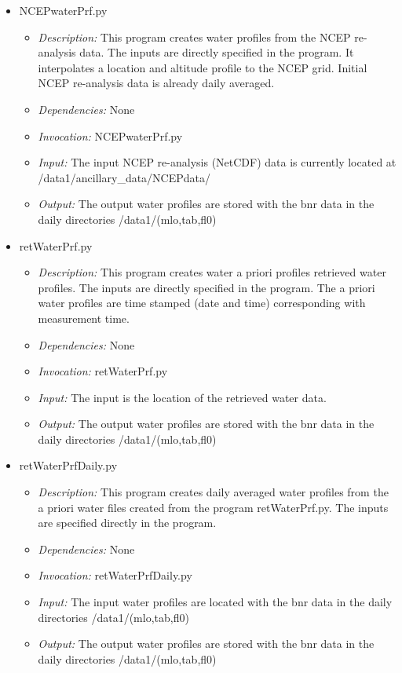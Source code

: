 \documentclass[12pt, letterpaper]{article}
\begin{document}
\begin{itemize}
\item NCEPwaterPrf.py
\begin{itemize}
\item \textit{Description:} This program creates water profiles from the NCEP re-analysis data. The inputs are directly specified in the program. It interpolates a location and altitude profile to the NCEP grid. Initial NCEP re-analysis data is already daily averaged.
\item \textit{Dependencies:} None
\item \textit{Invocation:} NCEPwaterPrf.py
\item \textit{Input:} The input NCEP re-analysis (NetCDF) data is currently located at /data1/ancillary\_data/NCEPdata/
\item \textit{Output:} The output water profiles are stored with the bnr data in the daily directories /data1/(mlo,tab,fl0)
\end{itemize}
\end{itemize}

\begin{itemize}
\item retWaterPrf.py
\begin{itemize}
\item \textit{Description:} This program creates water a priori profiles retrieved water profiles. The inputs are directly specified in the program. The a priori water profiles are time stamped (date and time) corresponding with measurement time.
\item \textit{Dependencies:} None
\item \textit{Invocation:} retWaterPrf.py
\item \textit{Input:} The input is the location of the retrieved water data.
\item \textit{Output:} The output water profiles are stored with the bnr data in the daily directories /data1/(mlo,tab,fl0)
\end{itemize}
\end{itemize}

\begin{itemize}
\item retWaterPrfDaily.py
\begin{itemize}
\item \textit{Description:} This program creates daily averaged water profiles from the a priori water files created from the program retWaterPrf.py. The inputs are specified directly in the program.
\item \textit{Dependencies:} None
\item \textit{Invocation:} retWaterPrfDaily.py
\item \textit{Input:} The input water profiles are located with the bnr data in the daily directories /data1/(mlo,tab,fl0)
\item \textit{Output:} The output water profiles are stored with the bnr data in the daily directories /data1/(mlo,tab,fl0)
\end{itemize}
\end{itemize}
\end{document}
